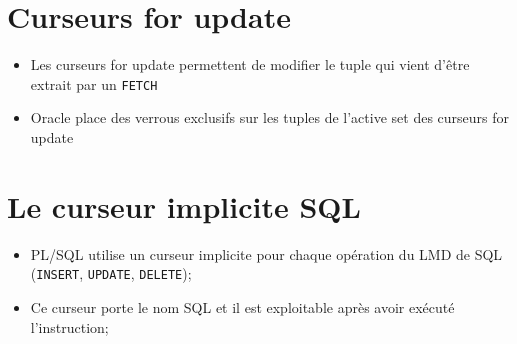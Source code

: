 \documentclass[10pt]{beamer}
\begin{document}
\section{Curseurs for update}
\begin{frame}{\secname}
    \begin{itemize}
        \item Les curseurs for update permettent de modifier le tuple qui vient d'être extrait par un \lstinline[language=plsql]!FETCH!
        \item Oracle place des verrous exclusifs sur les tuples de l'active set des curseurs for update
    \end{itemize}
    
\end{frame}
%     


\section{Le curseur implicite SQL}
\begin{frame}{\secname}
    \begin{itemize}
        \item PL/SQL utilise un curseur implicite pour chaque opération du LMD de SQL (\lstinline[language=plsql]!INSERT!, \lstinline[language=plsql]!UPDATE!, \lstinline[language=plsql]!DELETE!);
        \item Ce curseur porte le nom SQL et il est exploitable après avoir exécuté l'instruction;
    \end{itemize}
\end{frame}
\end{document}
